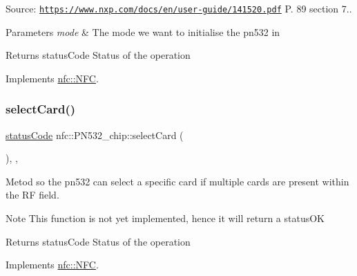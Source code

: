 Source\+: \href{https://www.nxp.com/docs/en/user-guide/141520.pdf}{\tt https\+://www.\+nxp.\+com/docs/en/user-\/guide/141520.\+pdf} P. 89 section 7..


\begin{DoxyParams}{Parameters}
{\em mode} & The mode we want to initialise the pn532 in \\
\hline
\end{DoxyParams}
\begin{DoxyReturn}{Returns}
status\+Code Status of the operation 
\end{DoxyReturn}


Implements \hyperlink{classnfc_1_1NFC_ab4dc91843bbd93211aa0f086e93b8608}{nfc\+::\+N\+FC}.

\mbox{\label{classnfc_1_1PN532__chip_a348f7d8d7cf3853e47307efe5f787f34}} 
\subsubsection{\texorpdfstring{select\+Card()}{selectCard()}}
{\footnotesize\ttfamily \hyperlink{declarations_8h_ae1d20c5a38cae82ccaa6a77be3fd264b}{status\+Code} nfc\+::\+P\+N532\+\_\+chip\+::select\+Card (\begin{DoxyParamCaption}{ }\end{DoxyParamCaption})\hspace{0.3cm}{\ttfamily [inline]}, {\ttfamily [override]}, {\ttfamily [virtual]}}



Metod so the pn532 can select a specific card if multiple cards are present within the RF field. 

\begin{DoxyNote}{Note}
This function is not yet implemented, hence it will return a status\+OK 
\end{DoxyNote}
\begin{DoxyReturn}{Returns}
status\+Code Status of the operation 
\end{DoxyReturn}


Implements \hyperlink{classnfc_1_1NFC_a89a1275bc915581d708c65d487427317}{nfc\+::\+N\+FC}.

\mbox{\label{classnfc_1_1PN532__chip_a3184528f3e8e793905d1638067cfe9e1}} 
